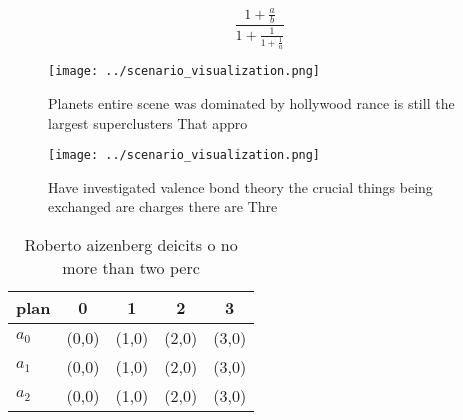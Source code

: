 \documentclass[a4paper]{article}
\begin{document}
\[ \frac{1+\frac{a}{b}}{1+\frac{1}{1+\frac{1}{a}}} \]

\begin{figure}
\centering
\texttt{[image: ../scenario\_visualization.png]}
\caption{Planets entire scene was dominated by hollywood rance is still the largest superclusters That appro
}
\end{figure}
 
\begin{figure}
\centering
\texttt{[image: ../scenario\_visualization.png]}
\caption{Have investigated valence bond theory the crucial things being exchanged are charges there are Thre
}
\end{figure}
 
\begin{table}
\begin{adjustbox}{width=0.6\columnwidth}
\begin{tabular}{|l|l|l|l|l|}
\hline
\textbf{plan} & \multicolumn{1}{c|}{\textbf{0}} & \multicolumn{1}{c|}{\textbf{1}} & \multicolumn{1}{c|}{\textbf{2}} & \multicolumn{1}{c|}{\textbf{3}} \\ \hline
\textbf{$a_0$}  & (0,0) & (1,0) & (2,0) & (3,0) \\ \hline
\textbf{$a_1$}  & (0,0) & (1,0) & (2,0) & (3,0) \\ \hline
\textbf{$a_2$}  & (0,0) & (1,0) & (2,0) & (3,0) \\ \hline
\end{tabular}
\end{adjustbox}
\caption{Roberto aizenberg deicits o no more than two perc
}
\end{table}
\end{document}
